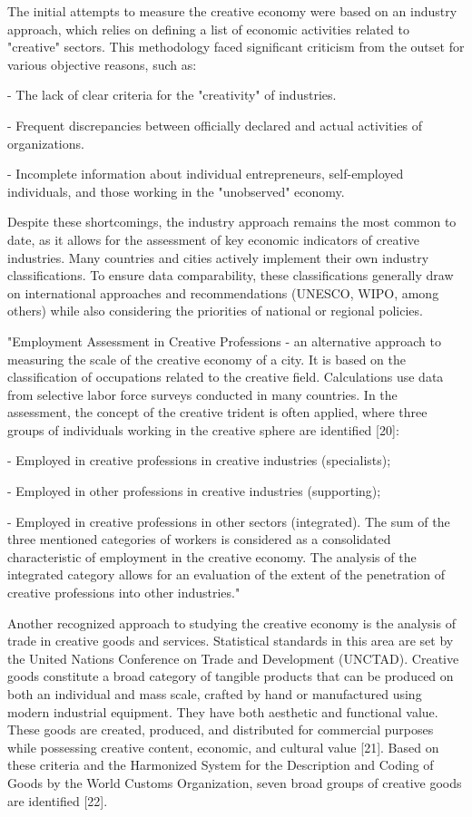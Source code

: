 The initial attempts to measure the creative economy were based on an
industry approach, which relies on defining a list of economic
activities related to "creative" sectors. This methodology faced
significant criticism from the outset for various objective reasons,
such as:

- The lack of clear criteria for the "creativity" of industries.

- Frequent discrepancies between officially declared and actual
activities of organizations.

- Incomplete information about individual entrepreneurs, self-employed
individuals, and those working in the "unobserved" economy.

Despite these shortcomings, the industry approach remains the most
common to date, as it allows for the assessment of key economic
indicators of creative industries. Many countries and cities actively
implement their own industry classifications. To ensure data
comparability, these classifications generally draw on international
approaches and recommendations (UNESCO, WIPO, among others) while also
considering the priorities of national or regional policies.

"Employment Assessment in Creative Professions - an alternative approach
to measuring the scale of the creative economy of a city. It is based on
the classification of occupations related to the creative field.
Calculations use data from selective labor force surveys conducted in
many countries. In the assessment, the concept of the
\textquotesingle creative trident\textquotesingle{} is often applied,
where three groups of individuals working in the creative sphere are
identified {[}20{]}:

- Employed in creative professions in creative industries
(\textquotesingle specialists\textquotesingle);

- Employed in other professions in creative industries
(\textquotesingle supporting\textquotesingle);

- Employed in creative professions in other sectors
(\textquotesingle integrated\textquotesingle). The sum of the three
mentioned categories of workers is considered as a consolidated
characteristic of employment in the creative economy. The analysis of
the \textquotesingle integrated\textquotesingle{} category allows for an
evaluation of the extent of the penetration of creative professions into
other industries."

Another recognized approach to studying the creative economy is the
analysis of trade in creative goods and services. Statistical standards
in this area are set by the United Nations Conference on Trade and
Development (UNCTAD). Creative goods constitute a broad category of
tangible products that can be produced on both an individual and mass
scale, crafted by hand or manufactured using modern industrial
equipment. They have both aesthetic and functional value. These goods
are created, produced, and distributed for commercial purposes while
possessing creative content, economic, and cultural value {[}21{]}.
Based on these criteria and the Harmonized System for the Description
and Coding of Goods by the World Customs Organization, seven broad
groups of creative goods are identified {[}22{]}.


